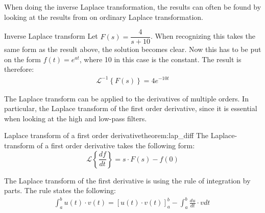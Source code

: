 When doing the inverse Laplace transformation, the results can often be found by looking at the results from on ordinary Laplace transformation.
\begin{example}{Inverse Laplace transform}{}
Let $F(s) = \dfrac{4}{s+10}$. When recognizing this takes the same form as the result above, the solution becomes clear. Now this has to be put on the form $f(t)=e^{at}$, where 10 in this case is the constant. The result is therefore: \cite[p. 323]{diffandcomplex}
\begin{align*}
\mathcal{L}^{-1} \left\{F(s) \right\} = 4e^{-10t}
\end{align*}
\end{example}
The Laplace transform can be applied to the derivatives of multiple orders. In particular, the Laplace transform of the first order derivative, since it is essential when looking at the high and low-pass filters.
\begin{theorem}{Laplace transform of a first order derivative}{theorem:lap_diff}
The Laplace-transform of a first order derivative takes the following form:
$$\mathcal{L} \left\{\frac{df}{dt} \right\} = s \cdot F(s)-f(0)$$
\end{theorem}
The Laplace transform of the first derivative is using the rule of integration by parts. The rule states the following:
\begin{align}
\int_{a}^{b}{u(t) \cdot v(t)}=\left[u(t) \cdot v(t) \right]_{a}^{b}-\int_{a}^{b} \frac{du}{dt}\cdot v dt\
\label{eq6.3}
\end{align}
